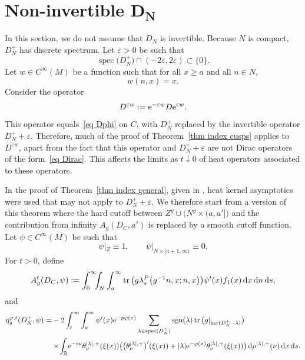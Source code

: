 \documentclass[10pt,a4paper]{amsart}
\numberwithin{equation}{section}
\DeclareMathOperator{\tr}{tr}
\DeclareMathOperator{\spec}{spec}
\DeclareMathOperator{\sgn}{sgn}
\newcommand{\R}{\mathbb{R}}
\begin{document}
\section[Non-invertible D\_N]{Non-invertible $\boldsymbol{D_N}$}\label{sec DN not invtble}\label{sec DN not inv}

In this section, we do not assume that $D_N$ is invertible. Because $N$ is compact, $D_N^+$ has discrete spectrum. Let $\varepsilon>0$ be such that
\begin{equation} \label{eq prop eps}
\spec\big(D_N^+\big) \cap (-2\varepsilon, 2\varepsilon) \subset \{0\}.
\end{equation}
Let $w \in C^{\infty}(M)$ be a function such that for all $x\geq a$ and all $n \in N$,
\begin{equation} \label{eq prop w}
w(n, x) = x.
\end{equation}
Consider the operator
\begin{equation} \label{eq def Depsw}
D^{\varepsilon w} := {\rm e}^{-\varepsilon w} D {\rm e}^{\varepsilon w}.
\end{equation}
This operator
 equals~\eqref{eq Dphi} on $C$, with $D_N^+$ replaced by the invertible operator $D_N^+ +\varepsilon$. Therefore, much of the proof of Theorem~\ref{thm index cusps} applies to $D^{\varepsilon w}$, apart from the fact that this operator and $D_N^+ + \varepsilon$ are not Dirac operators of the form~\eqref{eq Dirac}. This affects the limits as $t \downarrow 0$ of heat operators associated to these operators.

In the proof of Theorem~\ref{thm index general}, given in \cite{HW21a}, heat kernel asymptotics were used that may not apply to $D_N^+ + \varepsilon$. We therefore start from a version of this theorem where the hard cutoff between $Z^g \cup \big(N^g \times (a,a']\big)$ and the contribution from infinity $A_g(D_C, a')$
 is replaced by a smooth cutoff function. Let $\psi \in C^{\infty}(M)$ be such that
 \begin{equation} \label{eq prop psi}
\psi|_Z \equiv 1,\qquad \psi|_{N \times [a+1, \infty)}\equiv 0.
 \end{equation}
 For $t>0$, define
 \[
 A_g^t(D_C, \psi) := \int_0^{\infty}\!\!\!
\int_N \int_a^{\infty} \tr\big(g \lambda_s^{P}\big(g^{-1}n, x; n, x\big)\big) \psi'(x) f_1(x)\, {\rm d}x\, {\rm d}n\, {\rm d}s,
 \]
 and
 \begin{align*} %
\eta^{\varphi, t}_g(D_N^+, \psi) =&-2 \int_{t}^{\infty}
\int_{a}^{\infty} \psi' ( x){\rm e}^{-p\varphi(x)}
\sum_{\lambda \in \spec(D_N^+)}\sgn(\lambda) \tr\big(g|_{\ker(D_N^+ - \lambda)}\big)
\\
&\times\!\int_{\R}\!{\rm e}^{-s\nu}
\theta^{|\lambda|, +}_{\nu} (\xi(x))
 \big( \big(\theta^{|\lambda|, +}_{\nu} \big)'(\xi(x)) +|\lambda| {\rm e}^{-\varphi(x)} \theta^{|\lambda|, +}_{\nu} (\xi(x))
 \big)\,{\rm d}\rho^{|\lambda|, +}(\nu)\, {\rm d}x \, {\rm d}s.
 \end{align*}
\end{document}
